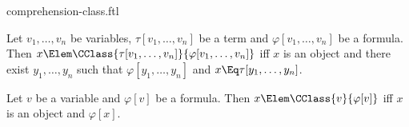 \documentclass{stex}
\begin{document}
\begin{smodule}{comprehension-class.ftl}


\begin{fakeforthel}
  \begin{axiom}
    Let $v_1,\dots,v_n$ be variables, $\tau[v_1,\dots,v_n]$ be a term and $\varphi[v_1,\dots,v_n]$ be a formula.
    Then $x \Elem \CClass{\tau[v_1,\dots,v_n]}{\varphi[v_1,\dots,v_n]}$ iff
    $x$ is an object and there exist $y_1,\dots,y_n$ such that $\varphi[y_1,\dots,y_n]$ and $x \Eq \tau[y_1,\dots,y_n]$.
  \end{axiom}
\end{fakeforthel}

\begin{fakeforthel}
  \begin{corollary}
    Let $v$ be a variable and $\varphi[v]$ be a formula.
    Then $x \Elem \CClass{v}{\varphi[v]}$ iff $x$ is an object and $\varphi[x]$.
  \end{corollary}
\end{fakeforthel}

\end{smodule}
\end{document}
